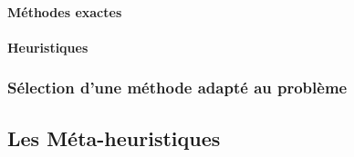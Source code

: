 \paragraph{Méthodes exactes} %
\label{par:methodes_exactes}


\paragraph{Heuristiques} %
\label{par:heuristics}


\subsubsection{Sélection d’une méthode adapté au problème} %
\label{ssub:selection_d_une_methode_adapte_au_probleme}



\subsection{Les Méta-heuristiques} %
\label{sub:les_meta_heuristiques}






